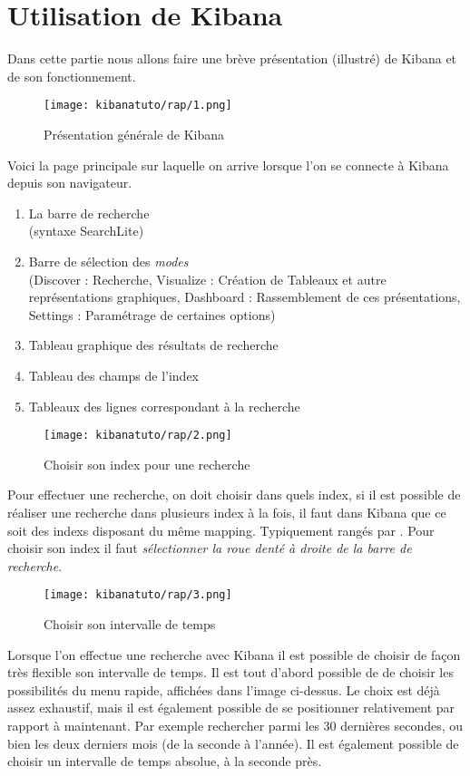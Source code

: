 \section{Utilisation de Kibana}
Dans cette partie nous allons faire une brève présentation (illustré) de Kibana et
de son fonctionnement.

\begin{figure}[H]
\center
\texttt{[image: kibanatuto/rap/1.png]}
\label{fig:kibanatuto1}
\caption{Présentation générale de Kibana}
\end{figure}

Voici la page principale sur laquelle on arrive lorsque l'on se connecte à Kibana
depuis son navigateur.

\begin{enumerate}
    \item La barre de recherche \\(syntaxe SearchLite)
    \item Barre de sélection des \emph{modes} \\(Discover : Recherche, Visualize : Création 
    de Tableaux et autre représentations graphiques, Dashboard : Rassemblement de
    ces présentations, Settings : Paramétrage de certaines options)
    \item Tableau graphique des résultats de recherche
    \item Tableau des champs de l'index
    \item Tableaux des lignes correspondant à la recherche
\end{enumerate}


\begin{figure}[H]
\center
\texttt{[image: kibanatuto/rap/2.png]}
\label{fig:kibanatuto2}
\caption{Choisir son index pour une recherche}
\end{figure}
Pour effectuer une recherche, on doit choisir dans quels index, si il est possible 
de réaliser une recherche dans plusieurs index à la fois, il faut dans Kibana que 
ce soit des indexs disposant du même mapping. Typiquement rangés par .
Pour choisir son index il faut \emph{sélectionner la roue denté à droite de la barre
de recherche}.


\begin{figure}[H]
\center
\texttt{[image: kibanatuto/rap/3.png]}
\label{fig:kibanatuto3}
\caption{Choisir son intervalle de temps}
\end{figure}
Lorsque l'on effectue une recherche avec Kibana il est possible de choisir de façon
très flexible son intervalle de temps.
Il est tout d'abord possible de de choisir les possibilités du menu rapide, affichées
dans l'image ci-dessus. Le choix est déjà assez exhaustif, mais il est également 
possible de se positionner relativement par rapport à maintenant. Par exemple rechercher 
parmi les 30 dernières secondes, ou bien les deux derniers mois (de la seconde à 
l'année). Il est également possible de choisir un intervalle de temps absolue, à 
la seconde près.

